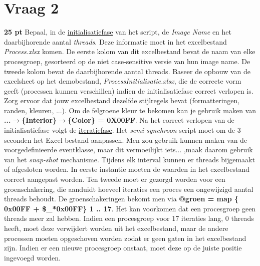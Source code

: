 \documentclass{article}
\def\warning#1{\color{red} #1 \color{black}}
\begin{document}
\section*{Vraag 2} 
\textbf{25 pt} Bepaal, in de \underline{initialisatiefase} van het script, de \emph{Image Name} en het daarbijhorende aantal \emph{threads}. Deze informatie moet in het excelbestand \emph{Process.xlsx} komen. De eerste kolom van dit excelbestand bevat de naam van elke procesgroep, gesorteerd op de niet case-sensitive versie van hun image name. De tweede kolom bevat de daarbijhorende aantal threads. Baseer de opbouw van de excelsheet op het demobestand, \emph{ProcessInitialisatie.xlsx}, die de correcte vorm geeft (processen kunnen verschillen) indien de initialisatiefase correct verlopen is. Zorg ervoor dat jouw excelbestand dezelfde stijlregels bevat (formatteringen, randen, kleuren, ...). Om de felgroene kleur te bekomen kan je gebruik maken van \textbf{...$\rightarrow$\{Interior\}$\rightarrow$\{Color\} = 0X00FF}. 
Na het correct verlopen van de initialisatiefase volgt de \underline{iteratiefase}. Het \emph{semi-synchroon} script moet om de 3 seconden het Excel bestand aanpassen. Men zou gebruik kunnen maken van de voorgedefinieerde eventklasse, maar dit vermoeilijkt \warning{iets...} ,maak daarom gebruik van het \emph{snap-shot} mechanisme.
Tijdens elk interval kunnen er threads bijgemaakt of afgesloten worden. In eerste instantie moeten de waarden in het excelbestand correct aangepast worden. Ten tweede moet er gezorgd worden voor een groenschakering, die aanduidt hoeveel iteraties een proces een ongewijzigd aantal threads behoudt. De groenschakeringen bekomt men via \textbf{@groen = map \{ 0x00FF + \$\_*0x00FF\} 1 .. 17}. Het kan voorkomen dat een procesgroep geen threads meer zal hebben. Indien een procesgroep voor 17 iteraties lang, 0 threads heeft, moet deze verwijdert worden uit het excelbestand, maar de andere processen moeten opgeschoven worden zodat er geen gaten in het excelbestand zijn. Indien er een nieuwe procesgroep onstaat, moet deze op de juiste positie ingevoegd worden. 
\end{document}
